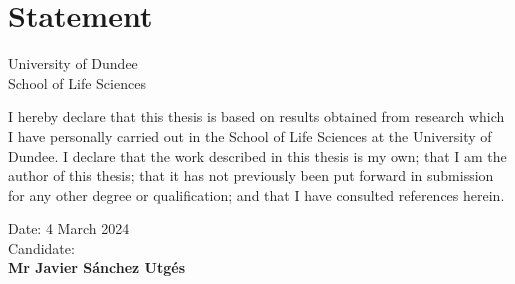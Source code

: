 \chapter*{Statement}

\begin{center}
    \LARGE University of Dundee\\[1cm]
    \LARGE School of Life Sciences\\[2cm]
\end{center}

I hereby declare that this thesis is based on results obtained from research which I have personally carried out in the School of Life Sciences at the University of Dundee. I declare that the work described in this thesis is my own; that I am the author of this thesis; that it has not previously been put forward in submission for any other degree or qualification; and that I have consulted references herein.

\vfill

\begin{flushright}
    Date: 4 March 2024\\[1cm]
    Candidate:{\hspace{2cm}}
    \\[1cm]
    \textbf{Mr Javier Sánchez Utgés}
\end{flushright}